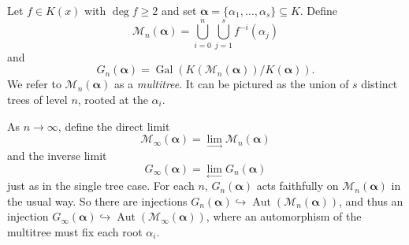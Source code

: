 \documentclass[11pt]{amsart}
\newtheorem{question}[thm]{Question}
\theoremstyle{definition}
\theoremstyle{definition}
\numberwithin{thm}{section}
\numberwithin{equation}{thm}
\newcommand{\cL}{\mathcal L}
\newcommand{\cM}{\mathcal M}
\newcommand{\Kbar}{\ensuremath {\overline K}}
\newcommand{\ba}{{\boldsymbol \alpha}}
\DeclareMathOperator{\Gal}{Gal}
\DeclareMathOperator{\Aut}{Aut}
\begin{document}
Let $f\in K(x)$ with $\deg f\geq 2$ and set $\ba = \{\alpha_1,\dots,\alpha_s\}\subseteq K$. 
Define
\[
\cM_n(\ba)= \bigcup_{i=0}^n \bigcup_{j=1}^s f^{-i}(\alpha_j)
\]
and
\[
G_n(\ba) = \Gal(K(\cM_n(\ba ))/K(\ba )).
\]
We refer to $\cM_n(\ba)$ as a \emph{multitree}. It can be pictured as the union of $s$ distinct trees of level $n$, rooted at the $\alpha_i$.

As $n\to\infty$, define the direct limit \[\cM_\infty(\ba) = \lim_{\longrightarrow} \cM_n(\ba)\]
 and the inverse limit \[G_\infty(\ba) = \lim_{\longleftarrow} G_n(\ba)\] 
 just as in the single tree case.
For each $n$, $G_n(\ba) $ acts faithfully on 
$\cM_n(\ba)$ in the usual way. So there are injections 
$G_n(\ba) \hookrightarrow\Aut(\cM_n(\ba))$, and thus an injection 
$G_\infty(\ba) \hookrightarrow\Aut(\cM_\infty(\ba))$, where an automorphism of the 
multitree must fix each root $\alpha_i$. 



\end{document}
